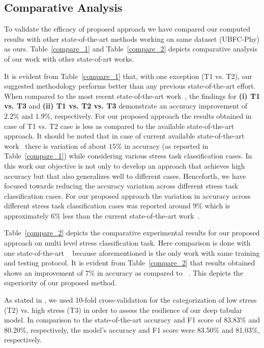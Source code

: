 \subsection{Comparative Analysis} To validate the efficacy  of  proposed approach we have compared our computed results with other state-of-the-art methods working on same dataset (UBFC-Phy) as ours. Table~\ref{compare_1} and Table~\ref{compare_2} depicts comparative analysis of our work with other state-of-art works.

It is evident from Table~\ref{compare_1} that, with one exception (T1 vs. T2), our suggested methodology performs better than any previous state-of-the-art effort. When compared to the most recent state-of-the-art work~\cite{ziaratnia2024multimodal}, the findings for \textbf{(i) T1 vs. T3} and \textbf{(ii) T1 vs. T2 vs. T3} demonstrate an accuracy improvement of $2.2\%$ and $1.9\%$, respectively. For our proposed approach the results obtained in case of T1 vs. T2  case is less as compared to the available state-of-the-art approach. It should be noted that in case of current available state-of-the-art work~\cite{ziaratnia2024multimodal} there is variation of about $15\%$  in accuracy (as reported in Table~\ref{compare_1})  while considering various stress task classification cases. In this work our objective is not only to develop an approach that achieves high accuracy  but that also generalizes well to different cases. Henceforth,  we have focused  towards reducing  the accuracy variation across different stress task classification cases. For our proposed approach the variation in accuracy across different stress task classification cases was reported around $9\%$ which is approximately $6\%$ less than the current state-of-the-art work~\cite{ziaratnia2024multimodal}.

Table~\ref{compare_2} depicts the comparative experimental results for our proposed approach on multi level stress classification task. Here comparison is done with one state-of-the-art ~\cite{ziaratnia2024multimodal} because aforementioned  is the only work with same training and testing protocol. It is evident from Table~\ref{compare_2} that results obtained shows an improvement of $7\%$ in accuracy as compared to ~\cite{ziaratnia2024multimodal}. This depicts the superiority of our proposed method.

As stated in \cite{xu2024facial}, we used 10-fold cross-validation for the categorization of low stress (T2) vs. high stress (T3) in order to assess the resilience of our deep tabular model. In comparison to the state-of-the-art accuracy and F1 score of 83.83\% and 80.20\%, respectively, the model's accuracy and F1 score were 83.50\% and 81.03\%, respectively.


